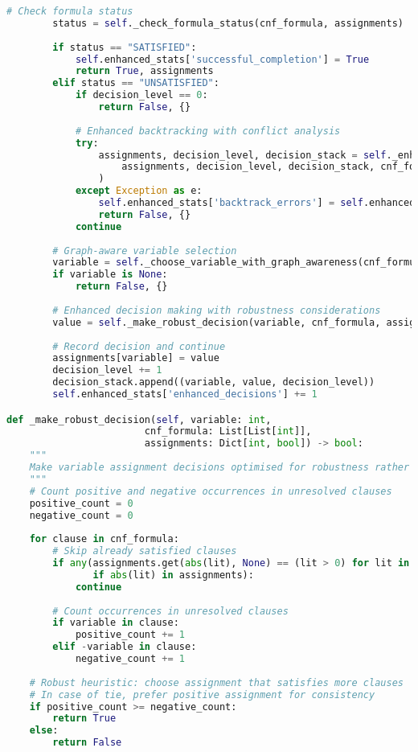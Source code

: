 \begin{lstlisting}[language=Python, caption=Graph-Aware Search Algorithm with Robustness Focus]
        # Check formula status
        status = self._check_formula_status(cnf_formula, assignments)
        
        if status == "SATISFIED":
            self.enhanced_stats['successful_completion'] = True
            return True, assignments
        elif status == "UNSATISFIED":
            if decision_level == 0:
                return False, {}
            
            # Enhanced backtracking with conflict analysis
            try:
                assignments, decision_level, decision_stack = self._enhanced_backtrack(
                    assignments, decision_level, decision_stack, cnf_formula
                )
            except Exception as e:
                self.enhanced_stats['backtrack_errors'] = self.enhanced_stats.get('backtrack_errors', 0) + 1
                return False, {}
            continue
        
        # Graph-aware variable selection
        variable = self._choose_variable_with_graph_awareness(cnf_formula, assignments)
        if variable is None:
            return False, {}
        
        # Enhanced decision making with robustness considerations
        value = self._make_robust_decision(variable, cnf_formula, assignments)
        
        # Record decision and continue
        assignments[variable] = value
        decision_level += 1
        decision_stack.append((variable, value, decision_level))
        self.enhanced_stats['enhanced_decisions'] += 1

def _make_robust_decision(self, variable: int, 
                        cnf_formula: List[List[int]], 
                        assignments: Dict[int, bool]) -> bool:
    """
    Make variable assignment decisions optimised for robustness rather than speed.
    """
    # Count positive and negative occurrences in unresolved clauses
    positive_count = 0
    negative_count = 0
    
    for clause in cnf_formula:
        # Skip already satisfied clauses
        if any(assignments.get(abs(lit), None) == (lit > 0) for lit in clause 
               if abs(lit) in assignments):
            continue
        
        # Count occurrences in unresolved clauses
        if variable in clause:
            positive_count += 1
        elif -variable in clause:
            negative_count += 1
    
    # Robust heuristic: choose assignment that satisfies more clauses
    # In case of tie, prefer positive assignment for consistency
    if positive_count >= negative_count:
        return True
    else:
        return False
\end{lstlisting}

